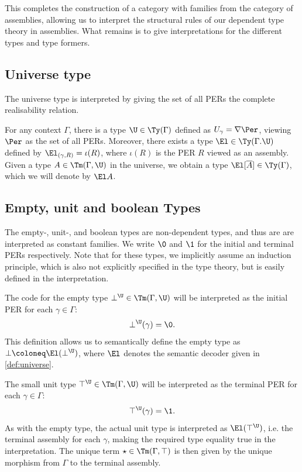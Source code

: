 This completes the construction of a category with families from the category of assemblies, allowing us to interpret the structural rules of our dependent type theory in assemblies. What remains is to give interpretations for the different types and type formers.

\subsection{Universe type}
The universe type is interpreted by giving the set of all PERs the complete realisability relation.
\begin{definition}\label{def:universe}
	For any context $\Gamma$, there is a type $\U \in \Ty(\Gamma)$ defined as $U_\gamma = \nabla \Per$, viewing $\Per$ as the set of all PERs. 
    Moreover, there exists a type $\El \in \Ty(\Gamma.\U)$ defined by $\El_{(\gamma, R)} = \iota(R)$, where $\iota(R)$ is the PER $R$ viewed as an assembly. Given a type $A \in \Tm(\Gamma, \U)$ in the universe, we obtain a type $\El[\overline{A}] \in \Ty(\Gamma)$, which we will denote by $\El A$.
\end{definition}

\subsection{Empty, unit and boolean Types}
The empty-, unit-, and boolean types are non-dependent types, and thus are are interpreted as constant families. We write $\0$ and $\1$ for the initial and terminal PERs respectively. Note that for these types, we implicitly assume an induction principle, which is also not explicitly specified in the type theory, but is easily defined in the interpretation.
\begin{definition}
The code for the empty type $\bot^\U \in \Tm(\Gamma, \U)$ will be interpreted as the initial PER for each $\gamma \in \Gamma$:
\[
\bot^\U(\gamma) = \0.
\]
This definition allows us to semantically define the empty type as $\bot \coloneq  \El (\bot^\U)$, where $\El$ denotes the semantic decoder given in \autoref{def:universe}.
\end{definition}

\begin{definition}
The small unit type $\top^\U \in \Tm(\Gamma, \U)$ will be interpreted as the terminal PER for each $\gamma \in \Gamma$:
\[
\top^\U(\gamma) = \1.
\]
As with the empty type, the actual unit type is interpreted as $\El (\top^\U)$, i.e. the terminal assembly for each $\gamma$, making the required type equality true in the interpretation.
The unique term $\star \in \Tm(\Gamma, \top)$ is then given by the unique morphism from $\Gamma$ to the terminal assembly.
\end{definition}

